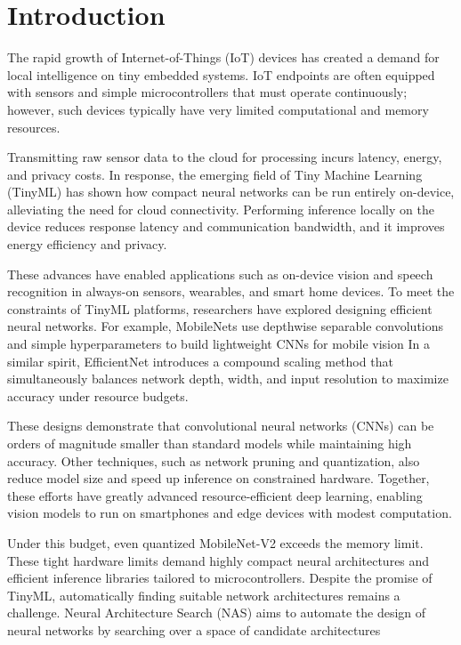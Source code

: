 \chapter{Introduction}

The rapid growth of Internet-of-Things (IoT) devices has created a demand for local intelligence on tiny embedded systems. IoT endpoints are often equipped with sensors and simple microcontrollers that must operate continuously; however, such devices typically have very limited computational and memory resources.

Transmitting raw sensor data to the cloud for processing incurs latency, energy, and privacy costs. In response, the emerging field of Tiny Machine Learning (TinyML) has shown how compact neural networks can be run entirely on-device, alleviating the need for cloud connectivity. Performing inference locally on the device reduces response latency and communication bandwidth, and it improves energy efficiency and privacy.\cite{alajlan2022tinyml}

These advances have enabled applications such as on-device vision and speech recognition in always-on sensors, wearables, and smart home devices. To meet the constraints of TinyML platforms, researchers have explored designing efficient neural networks. For example, MobileNets use depthwise separable convolutions and simple hyperparameters to build lightweight CNNs for mobile vision
\cite{ConvNetworksMobileNets} 
In a similar spirit, EfficientNet introduces a compound scaling method that simultaneously balances network depth, width, and input resolution to maximize accuracy under resource budgets. \cite{tan2019efficientnet}

These designs demonstrate that convolutional neural networks (CNNs) can be orders of magnitude smaller than standard models while maintaining high accuracy. Other techniques, such as network pruning and quantization, also reduce model size and speed up inference on constrained hardware. Together, these efforts have greatly advanced resource-efficient deep learning, enabling vision models to run on smartphones and edge devices with modest computation.


Under this budget, even quantized MobileNet-V2 exceeds the memory limit. These tight hardware limits demand highly compact neural architectures and efficient inference libraries tailored to microcontrollers. Despite the promise of TinyML, automatically finding suitable network architectures remains a challenge. Neural Architecture Search (NAS) aims to automate the design of neural networks by searching over a space of candidate architectures
 \cite{liu2022survey}

